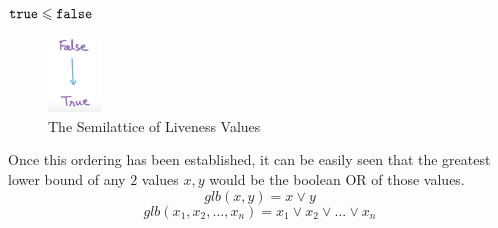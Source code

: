 \begin{center}
    ${\tt true} \leqslant {\tt false}$
\end{center}
\begin{figure}[H]
    \centering
    \includegraphics[height=2cm]{images/Module81_3.png}
    \caption{The Semilattice of Liveness Values}
\end{figure}

Once this ordering has been established, it can be easily seen that the greatest lower bound of any $2$ values $x, y$ would be the boolean OR of those values.
$$glb(x,y) = x \vee y$$
$$glb(x_1,x_2,...,x_n) = x_1 \vee x_2 \vee ... \vee x_n$$

